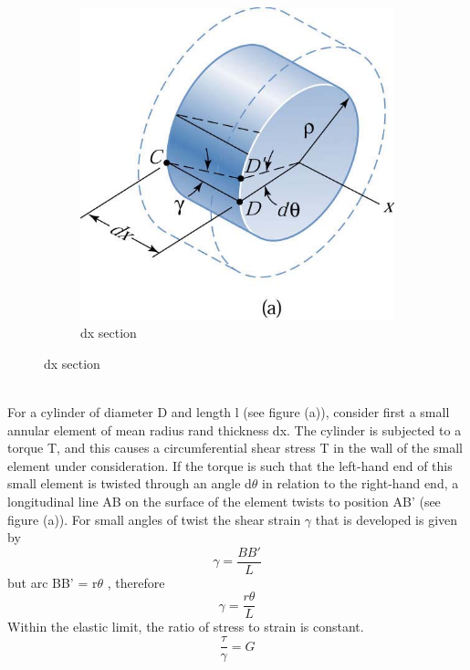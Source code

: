 \documentclass[12pt,a4paper]{article}	%
\begin{document}
\begin{figure}[h!]
\begin{subfigure}[b]{0.4\linewidth}
		\includegraphics[width=\linewidth]{Ok1.png}
		\caption{dx section}
	\end{subfigure}
\end{figure}
\\
For a cylinder of diameter D and length l (see figure (a)), consider first a small annular element of mean radius rand thickness dx. The cylinder is subjected to a torque T, and this causes a circumferential shear stress T in the wall of the small element under consideration. If the torque is such that the left-hand end of this small element is twisted through an angle d$\theta$ in relation to the right-hand end, a longitudinal line AB on the surface of the element twists to position AB' (see figure (a)). For small angles of twist the shear strain $\gamma$ that is developed is given by
\begin{equation}
\gamma = \frac{BB'}{L}
\end{equation}
but arc BB' = r$\theta$ , therefore
\begin{equation}
\gamma = \frac{r\theta}{L}
\end{equation}
Within the elastic limit, the ratio of stress to strain is constant.
\thispagestyle{empty}	%
\begin{equation}
\frac{\tau}{\gamma}=G
\end{equation}
\end{document}
